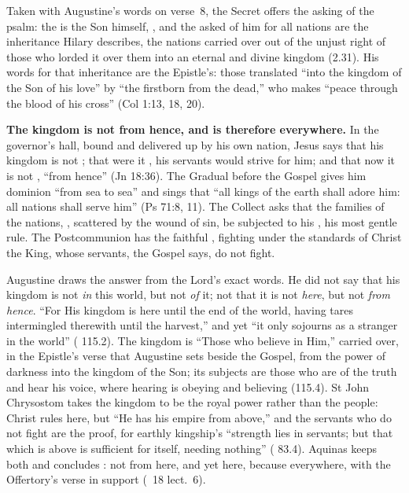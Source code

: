 Taken with Augustine's words on verse~8, the Secret offers the asking of the
psalm: the  is the Son himself,
, and the  asked of him for all nations are the inheritance Hilary describes,
the nations carried over out of the unjust right of those who lorded it over
them into an eternal and divine kingdom (2.31). His words for that
inheritance are the Epistle's: those translated
``into the kingdom of the Son of his love'' by ``the firstborn from the
dead,'' who makes ``peace through the blood of his cross'' (Col 1:13, 18, 20).

\textbf{The kingdom is not from hence, and is therefore everywhere.} In the
governor's hall, bound and delivered up by his own nation, Jesus says that his
kingdom is not ; that were it , his
servants would strive for him; and that now it is not , ``from
hence'' (Jn 18:36). The Gradual before the Gospel gives him dominion ``from sea
to sea'' and sings that ``all kings of the earth shall adore him: all nations
shall serve him'' (Ps 71:8, 11). The Collect asks that the families of the
nations, , scattered by the wound of sin, be
subjected to his , his most gentle rule. The
Postcommunion has the faithful ,
fighting under the standards of Christ the King, whose servants, the Gospel
says, do not fight.

Augustine draws the answer from the Lord's exact words. He did not say that
his kingdom is not \emph{in} this world, but not \emph{of} it; not that it is
not \emph{here}, but not \emph{from hence}. ``For His kingdom is here until the
end of the world, having tares intermingled therewith until the harvest,'' and
yet ``it only sojourns as a stranger in the world'' ( 115.2). The kingdom is ``Those who believe in Him,'' carried
over, in the Epistle's verse that Augustine sets beside the Gospel, from the
power of darkness into the kingdom of the Son; its subjects are those who are
of the truth and hear his voice, where hearing is obeying and believing
(115.4). St John Chrysostom takes the kingdom to be the royal power rather
than the people: Christ rules here, but ``He has his empire from above,'' and
the servants who do not fight are the proof, for earthly kingship's ``strength
lies in servants; but that which is above is sufficient for itself, needing
nothing'' ( 83.4). Aquinas keeps both and concludes
: not from here,
and yet here, because everywhere, with the Offertory's verse in support
(\ 18 lect.~6).

